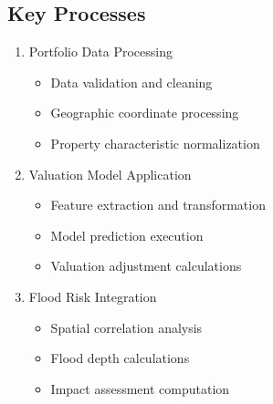 \documentclass{article}
\begin{document}
\subsection{Key Processes}
\begin{enumerate}
    \item Portfolio Data Processing
        \begin{itemize}
            \item Data validation and cleaning
            \item Geographic coordinate processing
            \item Property characteristic normalization
        \end{itemize}
    
    \item Valuation Model Application
        \begin{itemize}
            \item Feature extraction and transformation
            \item Model prediction execution
            \item Valuation adjustment calculations
        \end{itemize}
    
    \item Flood Risk Integration
        \begin{itemize}
            \item Spatial correlation analysis
            \item Flood depth calculations
            \item Impact assessment computation
        \end{itemize}
\end{enumerate}
\end{document}
